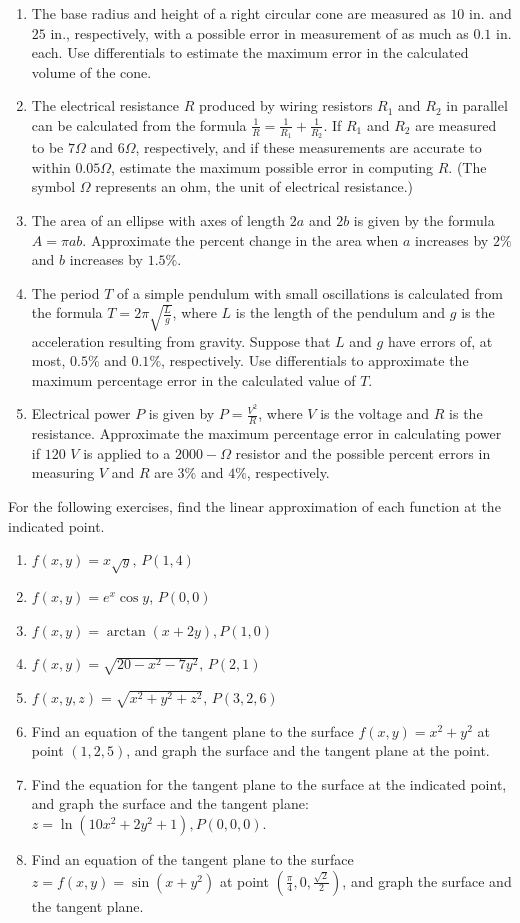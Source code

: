 \documentclass{exercises}
\begin{document}
\begin{enumerate}[resume]
\item The base radius and height of a right circular cone are measured as $10$ in. and $25$ in., respectively, with a possible error in measurement of as much as $0.1$ in. each. Use differentials to estimate the maximum error in the calculated volume of the cone.
\item The electrical resistance $R$ produced by wiring resistors $R_{1}$ and $R_{2}$ in parallel can be calculated from the formula $\frac{1}{R}=\frac{1}{R_{1}}+\frac{1}{R_{2}}$. If $R_{1}$ and $R_{2}$ are measured to be $7\Omega$ and $6\Omega$, respectively, and if these measurements are accurate to within $0.05\Omega$, estimate the maximum possible error in computing $R$. (The symbol $\Omega$ represents an ohm, the unit of electrical resistance.)
\item The area of an ellipse with axes of length $2a$ and $2b$ is given by the formula $A=\pi ab$. Approximate the percent change in the area when $a$ increases by $2\%$ and $b$ increases by $1.5\%$.
\item The period $T$ of a simple pendulum with small oscillations is calculated from the formula $T=2\pi \sqrt{\frac{L}{g}}$, where $L$ is the length of the pendulum and $g$ is the acceleration resulting from gravity. Suppose that $L$ and $g$ have errors of, at most, $0.5\%$ and $0.1\%$, respectively. Use differentials to approximate the maximum percentage error in the calculated value of $T$.
\item Electrical power $P$ is given by $P=\frac{V^{2}}{R}$, where $V$ is the voltage and $R$ is the resistance. Approximate the maximum percentage error in calculating power if $120$ $V$ is applied to a $2000-\Omega$ resistor and the possible percent errors in measuring $V$ and $R$ are $3\%$ and $4\%$, respectively.
\end{enumerate}

For the following exercises, find the linear approximation of each function at the indicated point.

\begin{enumerate}[resume]
\item $f(x,y)=x\sqrt{y},\,P(1,4)$
\item $f(x,y)=e^{x}\cos y$, $P(0,0)$
\item $f(x,y)=\arctan(x+2y),P(1,0)$
\item $f(x,y)=\sqrt{20-x^{2}-7y^{2}},\,P(2,1)$
\item $f(x,y,z)=\sqrt{x^{2}+y^{2}+z^{2}},\,P(3,2,6)$
\item \techrequired Find an equation of the tangent plane to the surface $f(x,y)=x^{2}+y^{2}$ at point $(1,2,5)$, and graph the surface and the tangent plane at the point.
\item \techrequired Find the equation for the tangent plane to the surface at the indicated point, and graph the surface and the tangent plane: $z=\ln(10x^{2}+2y^{2}+1),P(0,0,0)$.
\item \techrequired Find an equation of the tangent plane to the surface $z=f(x,y)=\sin(x+y^{2})$ at point $(\frac{\pi}{4},0,\frac{\sqrt{2}}{2})$, and graph the surface and the tangent plane.
\end{enumerate}
\end{document}
